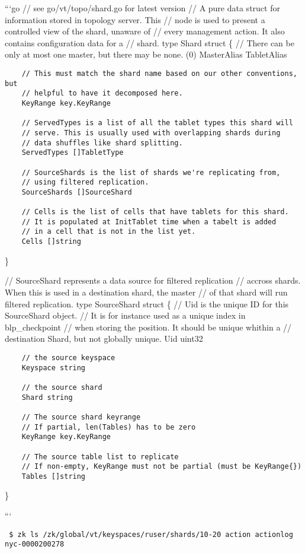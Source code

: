 ```go
// see go/vt/topo/shard.go for latest version
// A pure data struct for information stored in topology server.  This
// node is used to present a controlled view of the shard, unaware of
// every management action. It also contains configuration data for a
// shard.
type Shard struct \{
        // There can be only at most one master, but there may be none. (0)
        MasterAlias TabletAlias

\begin{verbatim}    // This must match the shard name based on our other conventions, but
    // helpful to have it decomposed here.
    KeyRange key.KeyRange

    // ServedTypes is a list of all the tablet types this shard will
    // serve. This is usually used with overlapping shards during
    // data shuffles like shard splitting.
    ServedTypes []TabletType

    // SourceShards is the list of shards we're replicating from,
    // using filtered replication.
    SourceShards []SourceShard

    // Cells is the list of cells that have tablets for this shard.
    // It is populated at InitTablet time when a tabelt is added
    // in a cell that is not in the list yet.
    Cells []string
\end{verbatim}
\}

// SourceShard represents a data source for filtered replication
// accross shards. When this is used in a destination shard, the master
// of that shard will run filtered replication.
type SourceShard struct \{
        // Uid is the unique ID for this SourceShard object.
        // It is for instance used as a unique index in blp\_checkpoint
        // when storing the position. It should be unique whithin a
        // destination Shard, but not globally unique.
        Uid uint32

\begin{verbatim}    // the source keyspace
    Keyspace string

    // the source shard
    Shard string

    // The source shard keyrange
    // If partial, len(Tables) has to be zero
    KeyRange key.KeyRange

    // The source table list to replicate
    // If non-empty, KeyRange must not be partial (must be KeyRange{})
    Tables []string
\end{verbatim}
\}

```

{\tt 
\$ zk ls /zk/global/vt/keyspaces/ruser/shards/10-20
action
actionlog
nyc-0000200278
}

